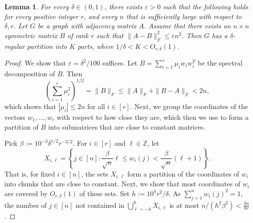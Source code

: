 \documentclass[11pt]{article}
\theoremstyle{plain}
\newtheorem{lemma}[theorem]{Lemma}
\theoremstyle{definition}
\newcommand{\eps}{\varepsilon}
\begin{document}
\begin{lemma}\label{lemma:dens2_low_rank_approx}
For every $\delta\in(0,1)$, there exists $\eps>0$ such that the following holds for every positive integer $r$, and every $n$ that is sufficiently large with respect to $\delta,r$. Let $G$ be a graph with adjacency matrix  $A$. Assume that there exists an $n\times n$ symmetric matrix $B$ of rank $r$ such that $\|A-B\|_F^2\leq \eps n^2$. Then $G$ has a $\delta$-regular partition into $K$ parts, where  $1/\delta<K<O_{r,\delta}(1)$.
\end{lemma}

\begin{proof}
We show that $\eps=\delta^2/100$ suffices. Let $B=\sum_{i=1}^r\mu_i w_iw_i^T$ be the spectral decomposition of $B$. Then 
$$\left(\sum_{i=1}^r\mu_i^2\right)^{1/2}=\|B\|_F\leq \|A\|_F+\|B-A\|_F<2n,$$
which shows that $|\mu_i|\leq 2n$ for all $i\in [r]$. Next, we group the coordinates of the vectors $w_1,\dots,w_r$ with respect to how close they are, which then we use to form a partition of $B$ into submatrices that are close to constant matrices. 

Pick $\beta:=10^{-3}\delta^{1/2}r^{-3/2}$.
For $i \in [r]$ and $\ell\in\mathbb{Z}$, let 
$$X_{i,\ell}=\left\{j\in [n]: \frac{\beta}{\sqrt{n}}\ell\leq w_i(j)<\frac{\beta}{\sqrt{n}}(\ell+1)\right\}.$$
That is, for fixed $i\in [n]$, the sets $X_{i,\ell}$ form a partition of the coordinates of $w_i$ into chunks that are close to constant. Next, we show that most coordinates of $w_i$ are covered by $O_{r,\delta}(1)$ of these sets. Set $h:=10^4r^2/\delta$. As $\sum_{j=1}^nw_i(j)^2=1$, the number of $j\in [n]$ not contained in $\bigcup_{\ell=-h}^hX_{i,\ell}$ is at most $n/(h^2\beta^2)< \frac{\delta n}{8r}$. 


\end{proof}
\end{document}
